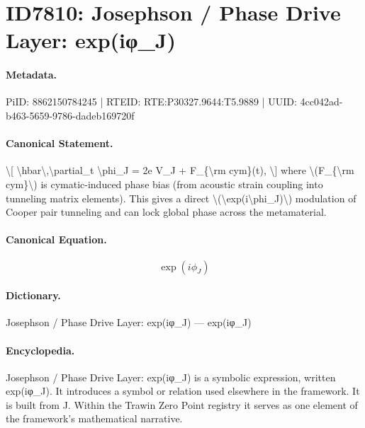 \section*{ID7810: Josephson / Phase Drive Layer: exp(iφ\_J)}
\paragraph{Metadata.}
PiID: 8862150784245 | RTEID: RTE:P30327.9644:T5.9889 | UUID: 4cc042ad-b463-5659-9786-dadeb169720f

\paragraph{Canonical Statement.}
\textbackslash{}[ \textbackslash{}hbar\textbackslash{},\textbackslash{}partial\_t \textbackslash{}phi\_J = 2e V\_J + F\_\{\textbackslash{}rm cym\}(t), \textbackslash{}] where \textbackslash{}(F\_\{\textbackslash{}rm cym\}\textbackslash{}) is cymatic-induced phase bias (from acoustic strain coupling into tunneling matrix elements). This gives a direct \textbackslash{}(\textbackslash{}exp(i\textbackslash{}phi\_J)\textbackslash{}) modulation of Cooper pair tunneling and can lock global phase across the metamaterial.

\paragraph{Canonical Equation.}
\[
\exp(i\phi_J)
\]

\paragraph{Dictionary.}
Josephson / Phase Drive Layer: exp(iφ\_J) — exp(iφ\_J)

\paragraph{Encyclopedia.}
Josephson / Phase Drive Layer: exp(iφ\_J) is a symbolic expression, written exp(iφ\_J). It introduces a symbol or relation used elsewhere in the framework. It is built from J. Within the Trawin Zero Point registry it serves as one element of the framework's mathematical narrative.
